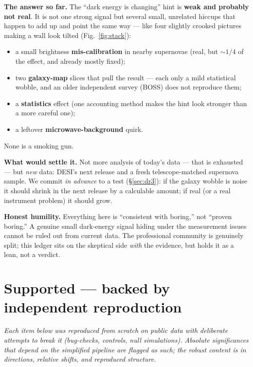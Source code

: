 \documentclass[11pt]{article}
\begin{document}
\textbf{The answer so far.} The ``dark energy is changing'' hint is \textbf{weak and probably not real}. It is not one strong signal but several small, unrelated hiccups that happen to add up and point the same way --- like four slightly crooked pictures making a wall look tilted (Fig.~\ref{fig:stack}):
\begin{itemize}[leftmargin=1.4em,itemsep=1pt]
\item a small brightness \textbf{mis-calibration} in nearby supernovae (real, but $\sim\!1/4$ of the effect, and already mostly fixed);
\item two \textbf{galaxy-map} slices that pull the result --- each only a mild statistical wobble, and an older independent survey (BOSS) does not reproduce them;
\item a \textbf{statistics} effect (one accounting method makes the hint look stronger than a more careful one);
\item a leftover \textbf{microwave-background} quirk.
\end{itemize}
None is a smoking gun.

\textbf{What would settle it.} Not more analysis of today's data --- that is exhausted --- but \emph{new} data: DESI's next release and a fresh telescope-matched supernova sample. We commit \emph{in advance} to a test (\S\ref{sec:dr3}): if the galaxy wobble is noise it should shrink in the next release by a calculable amount; if real (or a real instrument problem) it should grow.

\textbf{Honest humility.} Everything here is ``consistent with boring,'' not ``proven boring.'' A genuine small dark-energy signal hiding under the measurement issues cannot be ruled out from current data. The professional community is genuinely split; this ledger sits on the skeptical side \emph{with} the evidence, but holds it as a lean, not a verdict.

\section{Supported --- backed by independent reproduction}

\emph{Each item below was reproduced from scratch on public data with deliberate attempts to break it (bug-checks, controls, null simulations). Absolute significances that depend on the simplified pipeline are flagged as such; the robust content is in directions, relative shifts, and reproduced structure.}
\end{document}
